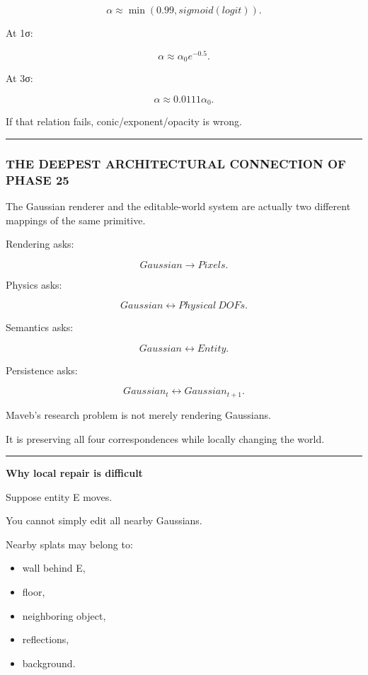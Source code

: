 \[
\alpha\approx
\min(
0.99,
sigmoid(logit)).
\]

At 1σ:

\[
\alpha
\approx
\alpha_0e^{-0.5}.
\]

At 3σ:

\[
\alpha
\approx
0.0111\alpha_0.
\]

If that relation fails, conic/exponent/opacity is wrong.

\begin{center}\rule{0.5\linewidth}{0.5pt}\end{center}

\subsubsection{THE DEEPEST ARCHITECTURAL CONNECTION OF PHASE 25}\label{the-deepest-architectural-connection-of-phase-25}

The Gaussian renderer and the editable-world system are actually two different mappings of the same primitive.

Rendering asks:

\[
\boxed{
Gaussian
\rightarrow
Pixels.
}
\]

Physics asks:

\[
\boxed{
Gaussian
\leftrightarrow
Physical\ DOFs.
}
\]

Semantics asks:

\[
\boxed{
Gaussian
\leftrightarrow
Entity.
}
\]

Persistence asks:

\[
\boxed{
Gaussian_t
\leftrightarrow
Gaussian_{t+1}.
}
\]

Maveb's research problem is not merely rendering Gaussians.

It is preserving all four correspondences while locally changing the world.

\begin{center}\rule{0.5\linewidth}{0.5pt}\end{center}

\textbf{Why local repair is difficult}

Suppose entity E moves.

You cannot simply edit all nearby Gaussians.

Nearby splats may belong to:

\begin{itemize}
\tightlist
\item
  wall behind E,
\item
  floor,
\item
  neighboring object,
\item
  reflections,
\item
  background.
\end{itemize}

